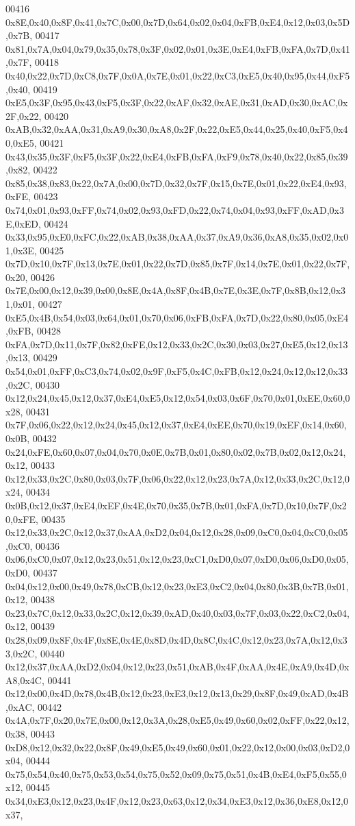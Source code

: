 \begin{DoxyCode}
00416 0x8E,0x40,0x8F,0x41,0x7C,0x00,0x7D,0x64,0x02,0x04,0xFB,0xE4,0x12,0x03,0x5D,0x7B,
00417 0x81,0x7A,0x04,0x79,0x35,0x78,0x3F,0x02,0x01,0x3E,0xE4,0xFB,0xFA,0x7D,0x41,0x7F,
00418 0x40,0x22,0x7D,0xC8,0x7F,0x0A,0x7E,0x01,0x22,0xC3,0xE5,0x40,0x95,0x44,0xF5,0x40,
00419 0xE5,0x3F,0x95,0x43,0xF5,0x3F,0x22,0xAF,0x32,0xAE,0x31,0xAD,0x30,0xAC,0x2F,0x22,
00420 0xAB,0x32,0xAA,0x31,0xA9,0x30,0xA8,0x2F,0x22,0xE5,0x44,0x25,0x40,0xF5,0x40,0xE5,
00421 0x43,0x35,0x3F,0xF5,0x3F,0x22,0xE4,0xFB,0xFA,0xF9,0x78,0x40,0x22,0x85,0x39,0x82,
00422 0x85,0x38,0x83,0x22,0x7A,0x00,0x7D,0x32,0x7F,0x15,0x7E,0x01,0x22,0xE4,0x93,0xFE,
00423 0x74,0x01,0x93,0xFF,0x74,0x02,0x93,0xFD,0x22,0x74,0x04,0x93,0xFF,0xAD,0x3E,0xED,
00424 0x33,0x95,0xE0,0xFC,0x22,0xAB,0x38,0xAA,0x37,0xA9,0x36,0xA8,0x35,0x02,0x01,0x3E,
00425 0x7D,0x10,0x7F,0x13,0x7E,0x01,0x22,0x7D,0x85,0x7F,0x14,0x7E,0x01,0x22,0x7F,0x20,
00426 0x7E,0x00,0x12,0x39,0x00,0x8E,0x4A,0x8F,0x4B,0x7E,0x3E,0x7F,0x8B,0x12,0x31,0x01,
00427 0xE5,0x4B,0x54,0x03,0x64,0x01,0x70,0x06,0xFB,0xFA,0x7D,0x22,0x80,0x05,0xE4,0xFB,
00428 0xFA,0x7D,0x11,0x7F,0x82,0xFE,0x12,0x33,0x2C,0x30,0x03,0x27,0xE5,0x12,0x13,0x13,
00429 0x54,0x01,0xFF,0xC3,0x74,0x02,0x9F,0xF5,0x4C,0xFB,0x12,0x24,0x12,0x12,0x33,0x2C,
00430 0x12,0x24,0x45,0x12,0x37,0xE4,0xE5,0x12,0x54,0x03,0x6F,0x70,0x01,0xEE,0x60,0x28,
00431 0x7F,0x06,0x22,0x12,0x24,0x45,0x12,0x37,0xE4,0xEE,0x70,0x19,0xEF,0x14,0x60,0x0B,
00432 0x24,0xFE,0x60,0x07,0x04,0x70,0x0E,0x7B,0x01,0x80,0x02,0x7B,0x02,0x12,0x24,0x12,
00433 0x12,0x33,0x2C,0x80,0x03,0x7F,0x06,0x22,0x12,0x23,0x7A,0x12,0x33,0x2C,0x12,0x24,
00434 0x0B,0x12,0x37,0xE4,0xEF,0x4E,0x70,0x35,0x7B,0x01,0xFA,0x7D,0x10,0x7F,0x20,0xFE,
00435 0x12,0x33,0x2C,0x12,0x37,0xAA,0xD2,0x04,0x12,0x28,0x09,0xC0,0x04,0xC0,0x05,0xC0,
00436 0x06,0xC0,0x07,0x12,0x23,0x51,0x12,0x23,0xC1,0xD0,0x07,0xD0,0x06,0xD0,0x05,0xD0,
00437 0x04,0x12,0x00,0x49,0x78,0xCB,0x12,0x23,0xE3,0xC2,0x04,0x80,0x3B,0x7B,0x01,0x12,
00438 0x23,0x7C,0x12,0x33,0x2C,0x12,0x39,0xAD,0x40,0x03,0x7F,0x03,0x22,0xC2,0x04,0x12,
00439 0x28,0x09,0x8F,0x4F,0x8E,0x4E,0x8D,0x4D,0x8C,0x4C,0x12,0x23,0x7A,0x12,0x33,0x2C,
00440 0x12,0x37,0xAA,0xD2,0x04,0x12,0x23,0x51,0xAB,0x4F,0xAA,0x4E,0xA9,0x4D,0xA8,0x4C,
00441 0x12,0x00,0x4D,0x78,0x4B,0x12,0x23,0xE3,0x12,0x13,0x29,0x8F,0x49,0xAD,0x4B,0xAC,
00442 0x4A,0x7F,0x20,0x7E,0x00,0x12,0x3A,0x28,0xE5,0x49,0x60,0x02,0xFF,0x22,0x12,0x38,
00443 0xD8,0x12,0x32,0x22,0x8F,0x49,0xE5,0x49,0x60,0x01,0x22,0x12,0x00,0x03,0xD2,0x04,
00444 0x75,0x54,0x40,0x75,0x53,0x54,0x75,0x52,0x09,0x75,0x51,0x4B,0xE4,0xF5,0x55,0x12,
00445 0x34,0xE3,0x12,0x23,0x4F,0x12,0x23,0x63,0x12,0x34,0xE3,0x12,0x36,0xE8,0x12,0x37,

\end{DoxyCode}

